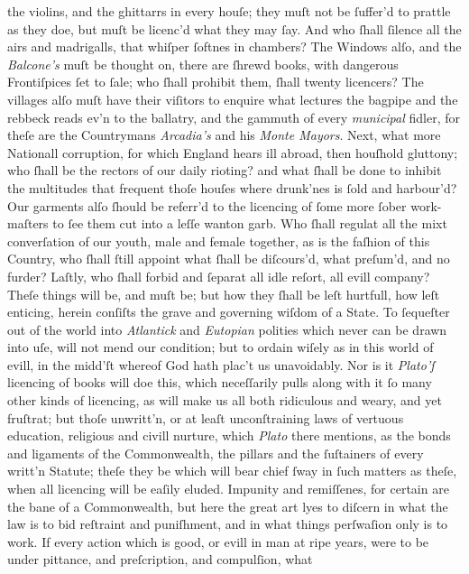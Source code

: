 the violins, and the ghittarrs in every houſe; they muſt not be ſuffer'd to
prattle as they doe, but muſt be licenc'd what they may ſay.  And who ſhall
ſilence all the airs and madrigalls, that whiſper ſoftnes in chambers?  The
Windows alſo, and the \textit{Balcone's} muſt be thought on, there are ſhrewd
books, with dangerous Frontiſpices ſet to ſale; who ſhall prohibit them, ſhall
twenty licencers?  The villages alſo muſt have their viſitors to enquire what
lectures the bagpipe and the rebbeck reads ev'n to the ballatry, and the gammuth
of every \textit{municipal} fidler, for theſe are the Countrymans
\textit{Arcadia's} and his \textit{Monte Mayors}.  Next, what more Nationall
corruption, for which England hears ill abroad, then houſhold gluttony; who
ſhall be the rectors of our daily rioting?  and what ſhall be done to inhibit
the multitudes that frequent thoſe houſes where drunk'nes is ſold and harbour'd?
Our garments alſo ſhould be referr'd to the licencing of ſome more ſober
work-maſters to ſee them cut into a leſſe wanton garb.  Who ſhall regulat all
the mixt converſation of our youth, male and female together, as is the faſhion
of this Country, who ſhall ſtill appoint what ſhall be diſcours'd, what
preſum'd, and no furder?  Laſtly, who ſhall forbid and ſeparat all idle reſort,
all evill company?  Theſe things will be, and muſt be; but how they ſhall be
leſt hurtfull, how leſt enticing, herein conſiſts the grave and governing wiſdom
of a State.  To ſequeſter out of the world into \textit{Atlantick} and
\textit{Eutopian} polities which never can be drawn into uſe, will not mend our
condition; but to ordain wiſely as in this world of evill, in the midd'ſt
whereof God hath plac't us unavoidably.  Nor is it \textit{Plato'ſ} licencing of
books will doe this, which neceſſarily pulls along with it ſo many other kinds
of licencing, as will make us all both ridiculous and weary, and yet fruſtrat;
but thoſe unwritt'n, or at leaſt unconſtraining laws of vertuous education,
religious and civill nurture, which \textit{Plato} there mentions, as the bonds
and ligaments of the Commonwealth, the pillars and the ſuſtainers of every
writt'n Statute; theſe they be which will bear chief ſway in ſuch matters as
theſe, when all licencing will be eaſily eluded.  Impunity and remiſſenes, for
certain are the bane of a Commonwealth, but here the great art lyes to diſcern
in what the law is to bid reſtraint and puniſhment, and in what things
perſwaſion only is to work.  If every action which is good, or evill in man at
ripe years, were to be under pittance, and preſcription, and compulſion, what
